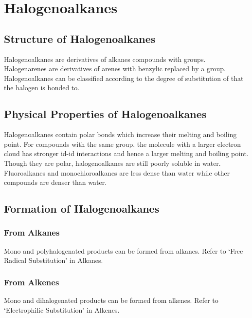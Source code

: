 \documentclass[../main]{subfiles}
\begin{document}
\section{Halogenoalkanes}

	\subsection{Structure of Halogenoalkanes}

	Halogenoalkanes are derivatives of alkanes compounds with  groups. Halogenarenes are derivatives of arenes with benzylic  replaced by a  group. \\

	Halogenoalkanes can be classified according to the degree of substitution of  that the halogen is bonded to.

	\subsection{Physical Properties of Halogenoalkanes}

	Halogenoalkanes contain polar  bonds which increase their melting and boiling point. For compounds with the same  group, the molecule with a larger  electron cloud has stronger id-id interactions and hence a larger melting and boiling point. \\

	Though they are polar, halogenoalkanes are still poorly soluble in water. Fluoroalkanes and monochloroalkanes are less dense than water while other  compounds are denser than water.

	\subsection{Formation of Halogenoalkanes}

	\subsubsection{From Alkanes}

	Mono and polyhalogenated products can be formed from alkanes. Refer to `Free Radical Substitution' in Alkanes.

	\subsubsection{From Alkenes}

	Mono and dihalogenated products can be formed from alkenes. Refer to `Electrophilic Substitution' in Alkenes.
\end{document}
